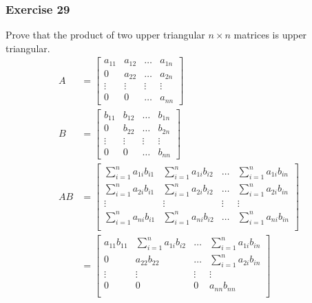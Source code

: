 \documentclass[letterpaper, 12pt]{math}
\begin{document}
\subsubsection*{Exercise 29}
Prove that the product of two upper triangular \( n\times n \) matrices is
upper triangular. \\
\begin{align*}
  A &= \begin{bmatrix}
    a_{11} & a_{12} & \dots & a_{1n} \\
    0 & a_{22} & \dots & a_{2n} \\
    \vdots & \vdots & \vdots & \vdots \\
    0 & 0 & \dots & a_{nn}
  \end{bmatrix} \\
  B &= \begin{bmatrix}
    b_{11} & b_{12} & \dots & b_{1n} \\
    0 & b_{22} & \dots & b_{2n} \\
    \vdots & \vdots & \vdots & \vdots \\
    0 & 0 & \dots & b_{nn}
  \end{bmatrix} \\
  AB &= \begin{bmatrix}
    \sum_{i=1}^{n}a_{1i}b_{i1} & \sum_{i=1}^{n}a_{1i}b_{i2} & \dots &
      \sum_{i=1}^{n}a_{1i}b_{in} \\[1em]
    \sum_{i=1}^{n}a_{2i}b_{i1} & \sum_{i=1}^{n}a_{2i}b_{i2} & \dots &
      \sum_{i=1}^{n}a_{2i}b_{in} \\[1em]
    \vdots & \vdots & \vdots & \vdots \\[1em]
    \sum_{i=1}^{n}a_{ni}b_{i1} & \sum_{i=1}^{n}a_{ni}b_{i2} & \dots &
      \sum_{i=1}^{n}a_{ni}b_{in} \\[1em]
  \end{bmatrix} \\
  &= \begin{bmatrix}
    a_{11}b_{11} & \sum_{i=1}^{n}a_{1i}b_{i2} & \dots &
      \sum_{i=1}^{n}a_{1i}b_{in} \\[1em]
    0 & a_{22}b_{22} & \dots & \sum_{i=1}^{n}a_{2i}b_{in} \\[1em]
    \vdots & \vdots & \vdots & \vdots \\[1em]
    0 & 0 & 0 & a_{nn}b_{nn} \\[1em]
  \end{bmatrix}
\end{align*}
\end{document}
